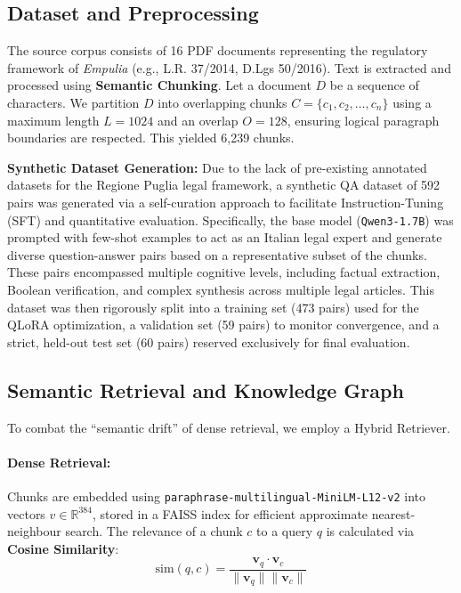 \documentclass[11pt,a4paper]{article}
\begin{document}
\subsection{Dataset and Preprocessing}
The source corpus consists of 16 PDF documents representing the regulatory framework of \textit{Empulia} (e.g., L.R. 37/2014, D.Lgs 50/2016). 
Text is extracted and processed using \textbf{Semantic Chunking}. Let a document $D$ be a sequence of characters. We partition $D$ into overlapping chunks $C = \{c_1, c_2, \dots, c_n\}$ using a maximum length $L=1024$ and an overlap $O=128$, ensuring logical paragraph boundaries are respected. This yielded 6,239 chunks.

\textbf{Synthetic Dataset Generation:} Due to the lack of pre-existing annotated datasets for the Regione Puglia legal framework, a synthetic QA dataset of 592 pairs was generated via a self-curation approach to facilitate Instruction-Tuning (SFT) and quantitative evaluation. Specifically, the base model (\texttt{Qwen3-1.7B}) was prompted with few-shot examples to act as an Italian legal expert and generate diverse question-answer pairs based on a representative subset of the chunks. These pairs encompassed multiple cognitive levels, including factual extraction, Boolean verification, and complex synthesis across multiple legal articles. This dataset was then rigorously split into a training set (473 pairs) used for the QLoRA optimization, a validation set (59 pairs) to monitor convergence, and a strict, held-out test set (60 pairs) reserved exclusively for final evaluation.

\subsection{Semantic Retrieval and Knowledge Graph}
To combat the ``semantic drift'' of dense retrieval, we employ a Hybrid Retriever.
\paragraph{Dense Retrieval:} Chunks are embedded using \texttt{paraphrase-multilingual-MiniLM-L12-v2} \cite{johnson2019billion} into vectors $v \in \mathbb{R}^{384}$, stored in a FAISS index for efficient approximate nearest-neighbour search. The relevance of a chunk $c$ to a query $q$ is calculated via \textbf{Cosine Similarity}:
\begin{equation}
\text{sim}(q, c) = \frac{\mathbf{v}_q \cdot \mathbf{v}_c}{\|\mathbf{v}_q\| \|\mathbf{v}_c\|}
\end{equation}
\end{document}
